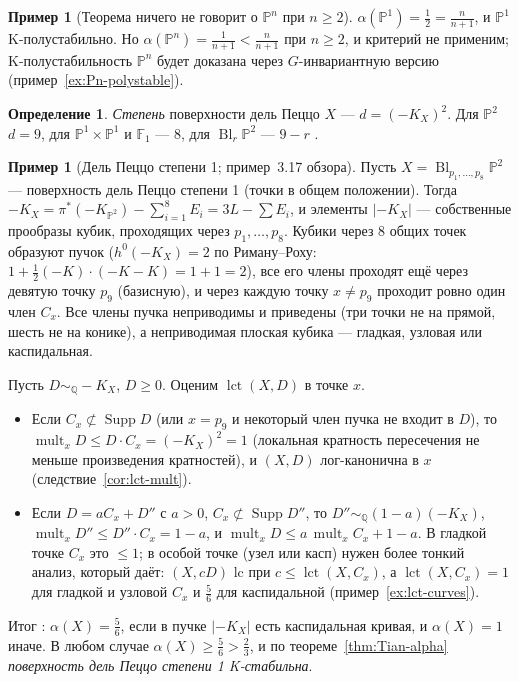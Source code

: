 \documentclass[11pt,a4paper]{article}
\theoremstyle{plain}
\theoremstyle{definition}
\newtheorem{definition}[theorem]{Определение}
\newtheorem{example}[theorem]{Пример}
\theoremstyle{remark}
\newcommand{\Q}{\mathbb{Q}}
\newcommand{\PP}{\mathbb{P}}
\DeclareMathOperator{\Bl}{Bl}
\DeclareMathOperator{\lct}{lct}
\DeclareMathOperator{\Supp}{Supp}
\DeclareMathOperator{\mult}{mult}
\begin{document}
\begin{example}[Теорема ничего не говорит о $\PP^n$ при $n\ge2$]
$\alpha(\PP^1)=\frac12=\frac n{n+1}$, и $\PP^1$ K-полустабильно. Но $\alpha(\PP^n)=\frac1{n+1}<\frac n{n+1}$
при $n\ge2$, и критерий не применим; K-полустабильность $\PP^n$ будет доказана через
$G$-инвариантную версию (пример~\ref{ex:Pn-polystable}).
\end{example}

\begin{definition}
\emph{Степень} поверхности дель Пеццо $X$ --- $d=(-K_X)^2$. Для $\PP^2$ $d=9$, для $\PP^1\times\PP^1$
и $\mathbb F_1$ --- $8$, для $\Bl_r\PP^2$ --- $9-r$ \cite[7.7]{AG}.
\end{definition}

\begin{example}[Дель Пеццо степени 1; пример~3.17 обзора]\label{ex:dP1-alpha}
Пусть $X=\Bl_{p_1,\dots,p_8}\PP^2$ --- поверхность дель Пеццо степени 1 (точки в общем положении).
Тогда $-K_X=\pi^*(-K_{\PP^2})-\sum_{i=1}^8E_i=3L-\sum E_i$, и элементы $|-K_X|$ --- собственные
прообразы кубик, проходящих через $p_1,\dots,p_8$. Кубики через 8 общих точек образуют пучок
($h^0(-K_X)=2$ по Риману--Роху: $1+\frac12(-K)\cdot(-K-K)=1+1=2$), все его члены проходят ещё через
девятую точку $p_9$ (базисную), и через каждую точку $x\ne p_9$ проходит ровно один член $C_x$.
Все члены пучка неприводимы и приведены (три точки не на прямой, шесть не на конике), а
неприводимая плоская кубика --- гладкая, узловая или каспидальная.

Пусть $D\sim_\Q-K_X$, $D\ge0$. Оценим $\lct(X,D)$ в точке $x$.
\begin{itemize}
\item Если $C_x\not\subset\Supp D$ (или $x=p_9$ и некоторый член пучка не входит в $D$), то
$\mult_xD\le D\cdot C_x=(-K_X)^2=1$ (локальная кратность пересечения не меньше произведения
кратностей), и $(X,D)$ лог-канонична в $x$ (следствие~\ref{cor:lct-mult}).
\item Если $D=aC_x+D''$ с $a>0$, $C_x\not\subset\Supp D''$, то $D''\sim_\Q(1-a)(-K_X)$,
$\mult_xD''\le D''\cdot C_x=1-a$, и $\mult_xD\le a\,\mult_xC_x+1-a$. В гладкой точке $C_x$ это
$\le1$; в особой точке (узел или касп) нужен более тонкий анализ, который даёт: $(X,cD)$ lc при
$c\le\lct(X,C_x)$, а $\lct(X,C_x)=1$ для гладкой и узловой $C_x$ и $\frac56$ для каспидальной
(пример~\ref{ex:lct-curves}).
\end{itemize}
Итог \cite[Thm~1.7]{Che08}: $\alpha(X)=\frac56$, если в пучке $|-K_X|$ есть каспидальная кривая, и
$\alpha(X)=1$ иначе. В любом случае $\alpha(X)\ge\frac56>\frac23$, и по теореме~\ref{thm:Tian-alpha}
\emph{поверхность дель Пеццо степени 1 K-стабильна}.
\end{example}
\end{document}
